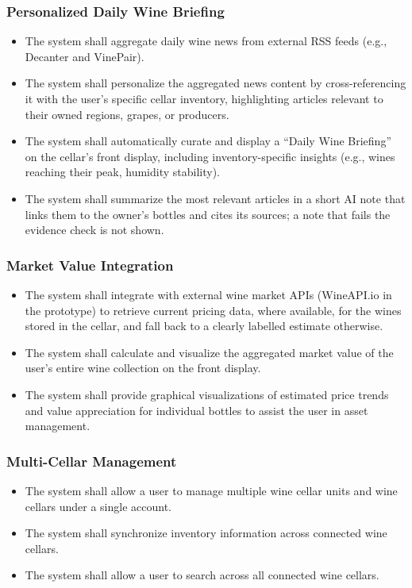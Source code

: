 \documentclass[conference]{IEEEtran}
\begin{document}
\subsubsection{Personalized Daily Wine Briefing}
\begin{itemize}
    \item The system shall aggregate daily wine news from external RSS feeds (e.g., Decanter and VinePair).
    \item The system shall personalize the aggregated news content by cross-referencing it with the user's specific cellar inventory, highlighting articles relevant to their owned regions, grapes, or producers.
    \item The system shall automatically curate and display a ``Daily Wine Briefing'' on the cellar's front display, including inventory-specific insights (e.g., wines reaching their peak, humidity stability).
    \item The system shall summarize the most relevant articles in a short AI note that links them to the owner's bottles and cites its sources; a note that fails the evidence check is not shown.
\end{itemize}

\subsubsection{Market Value Integration}
\begin{itemize}
    \item The system shall integrate with external wine market APIs (WineAPI.io in the prototype) to retrieve current pricing data, where available, for the wines stored in the cellar, and fall back to a clearly labelled estimate otherwise.
    \item The system shall calculate and visualize the aggregated market value of the user's entire wine collection on the front display.
    \item The system shall provide graphical visualizations of estimated price trends and value appreciation for individual bottles to assist the user in asset management.
\end{itemize}

\subsubsection{Multi-Cellar Management}
\begin{itemize}
    \item The system shall allow a user to manage multiple wine cellar units and wine cellars under a single account.
    \item The system shall synchronize inventory information across connected wine cellars.
    \item The system shall allow a user to search across all connected wine cellars.
\end{itemize}
\end{document}
